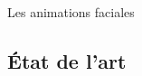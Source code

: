 \documentclass[compress,pdf,11pt,xcolor=dvipsnames]{beamer}
\begin{document}
\begin{frame}{Les animations faciales}
      
  \end{frame}

\subsection{État de l'art}
\end{document}
